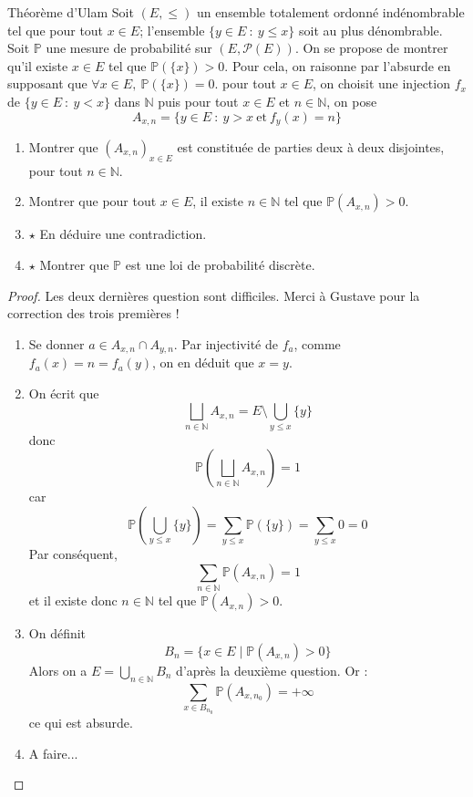 \documentclass[french,a4paper]{article}
\renewcommand{\P}{\mathbb{P}}
\newcommand{\N}{\mathbb{N}}
\theoremstyle{plain}
\theoremstyle{definition}
\theoremstyle{remark}
\begin{document}
\begin{ex}{Théorème d'Ulam}
	Soit $(E,\leqslant)$ un ensemble totalement ordonné indénombrable tel que pour tout $x\in E$; l'ensemble $\{y\in E\ :\ y\leqslant x\}$ soit au plus dénombrable. Soit $\P$ une mesure de probabilité sur $(E,\mathcal{P}(E))$. On se propose de montrer qu'il existe $x\in E$ tel que $\P(\{x\})>0$. Pour cela, on raisonne par l'absurde en supposant que $\forall x\in E,\ \P(\{x\})=0$. pour tout $x\in E$, on choisit une injection $f_x$ de $\{y\in E\ :\ y<x\}$ dans $\N$ puis pour tout $x\in E$ et $n\in\N$, on pose $$A_{x,n}=\{y\in E\ : \ y>x\ \text{et}\ f_y(x)=n\}$$
	\begin{enumerate}
		\item Montrer que $(A_{x,n})_{x\in E}$ est constituée de parties deux à deux disjointes, pour tout $n\in\N$.
		\item Montrer que pour tout $x\in E$, il existe $n\in\N$ tel que $\P(A_{x,n})>0$.
		\item $\star$ En déduire une contradiction.
		\item $\star$ Montrer que $\P$ est une loi de probabilité discrète.
	\end{enumerate}
\end{ex}
\begin{proof}
	Les deux dernières question sont difficiles. Merci à Gustave pour la correction des trois premières !
	\begin{enumerate}
		\item Se donner $a\in A_{x,n}\cap A_{y,n}$. Par injectivité de $f_a$, comme $f_a(x)=n=f_a(y)$, on en déduit que $x=y$.
		\item On écrit que $$\bigsqcup_{n\in\N}A_{x,n}=E\setminus\bigcup_{y\leqslant x}\{y\}$$ donc $$\P\left(\bigsqcup_{n\in\N}A_{x,n}\right)=1$$ car $$\P\left(\bigcup_{y\leqslant x}\{y\}\right)=\sum_{y\leqslant x}\P(\{y\})=\sum_{y\leqslant x}0=0$$ Par conséquent, $$\sum_{n\in\N}\P(A_{x,n})=1$$ et il existe donc $n\in\N$ tel que $\P(A_{x,n})>0$.
		\item On définit $$B_n=\{x\in E\mid \P(A_{x,n})>0\}$$ Alors on a $E=\displaystyle\bigcup_{n\in\N}B_n$ d'après la deuxième question. Or : $$\sum_{x\in B_{n_0}}\P(A_{x,n_0})=+\infty$$ ce qui est absurde.
		\item A faire...
	\end{enumerate}
\end{proof}
\end{document}
